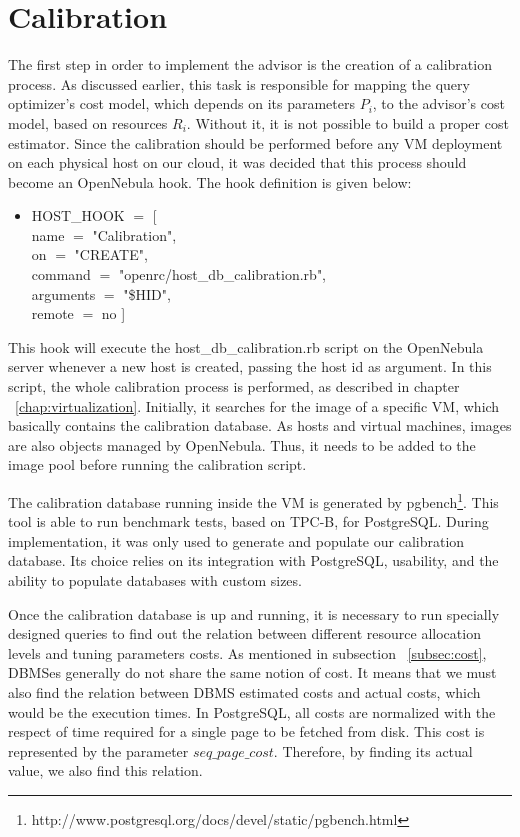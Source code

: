 \section{Calibration}
\label{sec:calib}

The first step in order to implement the advisor is the creation of a calibration process. As discussed earlier, this task is responsible for mapping the query optimizer's cost model, which depends on its parameters $P_{i}$, to  the advisor's cost model, based on resources $R_{i}$. Without it, it is not possible to build a proper cost estimator. Since the calibration should be performed before any VM deployment on each physical host on our cloud, it was decided that this process should become an OpenNebula hook. The hook definition is given below:
\begin{itemize}
 \item HOST\_HOOK $=$ [ \\
    name      $=$ "Calibration",\\
    on        $=$ "CREATE",\\
    command   $=$ "openrc/host\_db\_calibration.rb",\\
    arguments $=$ "\$HID",\\
    remote    $=$ no ]\\
\end{itemize}

This hook will execute the host\_db\_calibration.rb script on the OpenNebula server whenever a new host is created, passing the host id as argument. In this script, the whole calibration process is performed, as described in chapter ~\ref{chap:virtualization}. Initially, it searches for the image of a specific VM, which basically contains the calibration database. As hosts and virtual machines, images are also objects managed by OpenNebula. Thus, it needs to be added to the image pool before running the calibration script.

The calibration database running inside the VM is generated by pgbench\footnote{http://www.postgresql.org/docs/devel/static/pgbench.html}. This tool is able to run benchmark tests, based on TPC-B, for PostgreSQL. During implementation, it was only used to generate and populate our calibration database. Its choice relies on its integration with PostgreSQL, usability, and the ability to populate databases with custom sizes.

Once the calibration database is up and running, it is necessary to run specially designed queries to find out the relation between different resource allocation levels and tuning parameters costs.  As mentioned in subsection ~\ref{subsec:cost}, DBMSes generally do not  share the same notion of cost. It means that we must also find the relation between DBMS estimated costs and actual costs, which would be the execution times. In PostgreSQL, all costs are normalized with the respect of time required for a single page to be fetched from disk. This cost is represented by the parameter $seq\_page\_cost$. Therefore, by finding its actual value, we also find this relation. 


